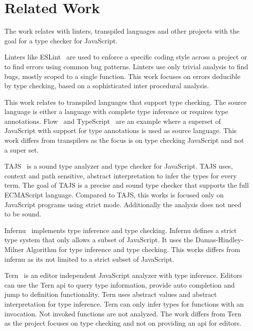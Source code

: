 \section{Related Work}
The work relates with linters, transpiled languages and other projects with the goal for a type checker for JavaScript. 

Linters like ESLint~\cite{jQuery2016} are used to enforce a specific coding style across a project or to find errors using common bug patterns. Linters use only trivial analysis to find bugs, mostly scoped to a single function. This work focuses on errors deducible by type checking, based on a sophisticated inter procedural analysis. 


This work relates to transpiled languages that support type checking. The source language is either a language with complete type inference\cite{Ekblad2012, McKenna} or requires type annotations. Flow~\cite{Facebook2014} and TypeScript~\cite{Microsoft2012} are an example where a superset of JavaScript with support for type annotations is used as source language.  This work differs from transpilers as the focus is on type checking JavaScript and not a super set.

TAJS~\cite{JensenMollerThiemann2009} is a sound type analyzer and type checker for JavaScript. TAJS uses, context and path sensitive, abstract interpretation to infer the types for every term. The goal of TAJS is a precise and sound type checker that supports the full ECMAScript language. Compared to TAJS, this works is focused only on JavaScript programs using strict mode. Additionally the analysis does not need to be sound. 

Infernu~\cite{Lewis} implements type inference and type checking. Infernu defines a strict type system that only allows a subset of JavaScript. It uses the Damas-Hindley-Milner Algorithm for type inference and type checking. This works differs from infernu as its not limited to a strict subset of JavaScript.

Tern~\cite{Haverbeke} is an editor independent JavaScript analyzer with type inference. Editors can use the Tern api to query type information, provide auto completion and jump to definition functionality. Tern uses abstract values and abstract interpretation for type inference. Tern can only infer types for functions with an invocation. Not invoked functions are not analyzed. The work differs from Tern as the project focuses on type checking and not on providing an api for editors. 

